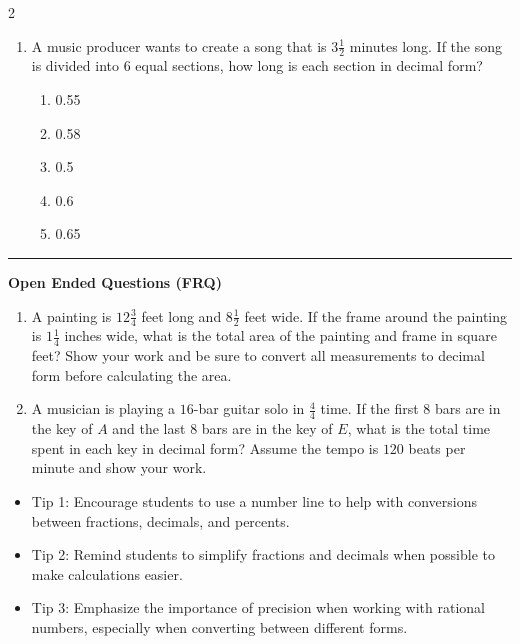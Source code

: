 \documentclass[10pt]{article}
\begin{document}
\begin{multicols}{2}
\begin{enumerate}[label=\textbf{Q\arabic*.}, leftmargin=*, itemsep=6pt, parsep=0pt]
  \item \small A music producer wants to create a song that is $3 \frac{1}{2}$ minutes long. If the song is divided into $6$ equal sections, how long is each section in decimal form?
  \begin{enumerate}[label=(\Alph*), leftmargin=0.6cm, nosep, itemsep=2pt]
    \item 0.55
    \item 0.58
    \item 0.5
    \item 0.6
    \item 0.65
  \end{enumerate}

\end{enumerate}
\end{multicols}

\vspace{-0.2cm}
\hrule
\vspace{0.2cm}
\textbf{\small Open Ended Questions (FRQ)}
\begin{enumerate}[label=\textbf{Q\arabic*.}, start=9, itemsep=5pt, topsep=0pt]

  \item \small A painting is $12 \frac{3}{4}$ feet long and $8 \frac{1}{2}$ feet wide. If the frame around the painting is $1 \frac{1}{4}$ inches wide, what is the total area of the painting and frame in square feet? Show your work and be sure to convert all measurements to decimal form before calculating the area. \vspace{2cm}

  \item \small A musician is playing a $16$-bar guitar solo in $\frac{4}{4}$ time. If the first $8$ bars are in the key of $A$ and the last $8$ bars are in the key of $E$, what is the total time spent in each key in decimal form? Assume the tempo is $120$ beats per minute and show your work. \vspace{2cm}

\end{enumerate}

\vfill

\begin{tcolorbox}[colback=blue!5, colframe=mainblue!50, title=\small \textbf{Chef's Tips}, fonttitle=\bfseries, bottom=1mm]
\begin{itemize}[noitemsep, topsep=2pt, leftmargin=0.5cm]
  \item \scriptsize Tip 1: Encourage students to use a number line to help with conversions between fractions, decimals, and percents.\item \scriptsize Tip 2: Remind students to simplify fractions and decimals when possible to make calculations easier.\item \scriptsize Tip 3: Emphasize the importance of precision when working with rational numbers, especially when converting between different forms.
\end{itemize}
\end{tcolorbox}
\end{document}
